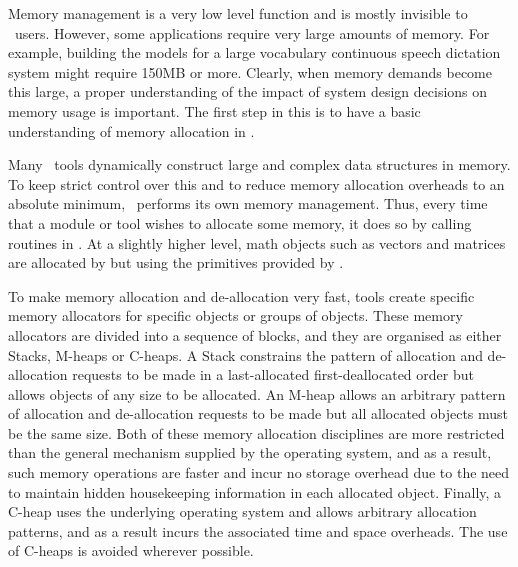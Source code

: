 
Memory management is a very low level function and is
mostly invisible to \HTK\ users.  However, some applications require very large
amounts of memory.  For example, building the models for a large vocabulary
continuous speech dictation system might require 150MB or more.  Clearly, when
memory demands become this large, a proper understanding of the impact of
system design decisions on memory usage is important.  The first step in this
is to have a basic understanding of memory allocation in \HTK.

Many \HTK\ tools dynamically construct large and complex data structures in
memory.  To keep strict control over this and to reduce memory allocation
overheads to an absolute minimum, \HTK\ performs its own memory
management. Thus, every time that a module or tool wishes to allocate some
memory, it does so by calling routines in
. At a slightly higher level, math objects
such as vectors and matrices are allocated by  but using the
primitives provided by .

To make memory allocation and de-allocation very fast,
tools create specific memory allocators for specific objects or groups of
objects.  These memory allocators are divided into a sequence of blocks, and
they are organised as either Stacks, M-heaps or
C-heaps.  A Stack constrains the pattern of allocation and
de-allocation requests to be made in a last-allocated first-deallocated order
but allows objects of any size to be allocated. An M-heap allows an arbitrary
pattern of allocation and de-allocation requests to be made but all allocated
objects must be the same size.  Both of these memory allocation disciplines are
more restricted than the general mechanism supplied by the operating system,
and as a result, such memory operations are faster and incur no storage
overhead due to the need to maintain hidden housekeeping information in each
allocated object.  Finally, a C-heap uses the underlying operating system and
allows arbitrary allocation patterns, and as a result incurs the associated
time and space overheads.  The use of C-heaps is avoided wherever possible.

